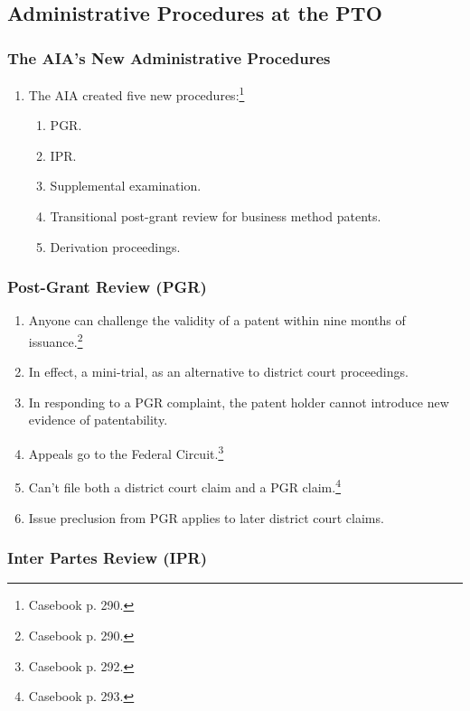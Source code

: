 \subsection{Administrative Procedures at the PTO}

\subsubsection{The AIA's New Administrative Procedures}

\begin{enumerate}
    \item The AIA created five new procedures:\footnote{Casebook p. 290.}
    \begin{enumerate}
        \item PGR.
        \item IPR.
        \item Supplemental examination.
        \item Transitional post-grant review for business method patents.
        \item Derivation proceedings.
    \end{enumerate}
\end{enumerate}

\subsubsection{Post-Grant Review (PGR)}

\begin{enumerate}
    \item Anyone can challenge the validity of a patent within nine months of 
    issuance.\footnote{Casebook p. 290.}
    \item In effect, a mini-trial, as an alternative to district court 
    proceedings.
    \item In responding to a PGR complaint, the patent holder cannot introduce 
    new evidence of patentability.
    \item Appeals go to the Federal Circuit.\footnote{Casebook p. 292.}
    \item Can't file both a district court claim and a PGR 
    claim.\footnote{Casebook p. 293.}
    \item Issue preclusion from PGR applies to later district court 
    claims.
\end{enumerate}

\subsubsection{Inter Partes Review (IPR)}

